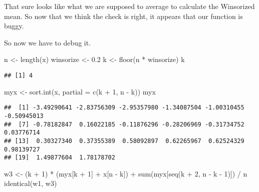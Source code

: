 \documentclass[
]{article}
\newenvironment{Shaded}{\begin{snugshade}}{\end{snugshade}}
\newcommand{\AttributeTok}[1]{\textcolor[rgb]{0.77,0.63,0.00}{#1}}
\newcommand{\DecValTok}[1]{\textcolor[rgb]{0.00,0.00,0.81}{#1}}
\newcommand{\FloatTok}[1]{\textcolor[rgb]{0.00,0.00,0.81}{#1}}
\newcommand{\FunctionTok}[1]{\textcolor[rgb]{0.00,0.00,0.00}{#1}}
\newcommand{\NormalTok}[1]{#1}
\newcommand{\OtherTok}[1]{\textcolor[rgb]{0.56,0.35,0.01}{#1}}
\newcommand{\SpecialCharTok}[1]{\textcolor[rgb]{0.00,0.00,0.00}{#1}}
\begin{document}
That sure looks like what we are supposed to average to calculate the
Winsorized mean. So now that we think the check is right, it appears
that our function is buggy.

So now we have to debug it.

\begin{Shaded}
\begin{Highlighting}[]
\NormalTok{n }\OtherTok{\textless{}{-}} \FunctionTok{length}\NormalTok{(x)}
\NormalTok{winsorize }\OtherTok{\textless{}{-}} \FloatTok{0.2}
\NormalTok{k }\OtherTok{\textless{}{-}} \FunctionTok{floor}\NormalTok{(n }\SpecialCharTok{*}\NormalTok{ winsorize)}
\NormalTok{k}
\end{Highlighting}
\end{Shaded}

\begin{verbatim}
## [1] 4
\end{verbatim}

\begin{Shaded}
\begin{Highlighting}[]
\NormalTok{myx }\OtherTok{\textless{}{-}} \FunctionTok{sort.int}\NormalTok{(x, }\AttributeTok{partial =} \FunctionTok{c}\NormalTok{(k }\SpecialCharTok{+} \DecValTok{1}\NormalTok{, n }\SpecialCharTok{{-}}\NormalTok{ k))}
\NormalTok{myx}
\end{Highlighting}
\end{Shaded}

\begin{verbatim}
##  [1] -3.49290641 -2.83756309 -2.95357980 -1.34087504 -1.00310455 -0.50945013
##  [7] -0.78182847  0.16022185 -0.11876296 -0.28206969 -0.31734752  0.03776714
## [13]  0.30327340  0.37355389  0.58092897  0.62265967  0.62524329  0.98139727
## [19]  1.49877604  1.78178702
\end{verbatim}

\begin{Shaded}
\begin{Highlighting}[]
\NormalTok{w3 }\OtherTok{\textless{}{-}}\NormalTok{ (k }\SpecialCharTok{+} \DecValTok{1}\NormalTok{) }\SpecialCharTok{*}\NormalTok{ (myx[k }\SpecialCharTok{+} \DecValTok{1}\NormalTok{] }\SpecialCharTok{+}\NormalTok{ x[n }\SpecialCharTok{{-}}\NormalTok{ k]) }\SpecialCharTok{+}
            \FunctionTok{sum}\NormalTok{(myx[}\FunctionTok{seq}\NormalTok{(k }\SpecialCharTok{+} \DecValTok{2}\NormalTok{, n }\SpecialCharTok{{-}}\NormalTok{ k }\SpecialCharTok{{-}} \DecValTok{1}\NormalTok{)]) }\SpecialCharTok{/}\NormalTok{ n}
\FunctionTok{identical}\NormalTok{(w1, w3)}
\end{Highlighting}
\end{Shaded}
\end{document}
